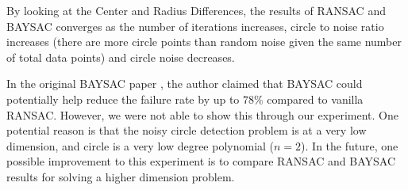 \documentclass[10pt,twocolumn,letterpaper]{article}
\begin{document}
By looking at the Center and Radius Differences, the results of RANSAC and BAYSAC converges as the number of iterations increases, circle to noise ratio increases (there are more circle points than random noise given the same number of total data points) and circle noise decreases.

In the original BAYSAC paper \cite{BaysacPaper}, the author claimed that BAYSAC could potentially help reduce the failure rate by up to $78\%$ compared to vanilla RANSAC. However, we were not able to show this through our experiment. One potential reason is that the noisy circle detection problem is at a very low dimension, and circle is a very low degree polynomial ($n = 2$). In the future, one possible improvement to this experiment is to compare RANSAC and BAYSAC results for solving a higher dimension problem.

\pagebreak
{\small
   
   
}
\end{document}
